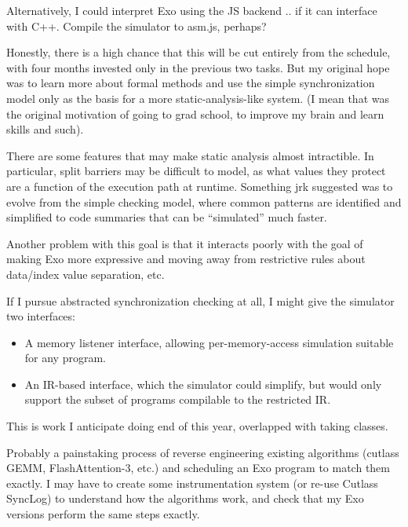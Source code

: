 \filbreak
Alternatively, I could interpret Exo using the JS backend .. if it can interface with C++.
Compile the simulator to asm.js, perhaps?

\filbreak
{}

Honestly, there is a high chance that this will be cut entirely from the schedule, with four months invested only in the previous two tasks.
But my original hope was to learn more about formal methods and use the simple synchronization model only as the basis for a more static-analysis-like system.
(I mean that was the original motivation of going to grad school, to improve my brain and learn skills and such).

\filbreak
There are some features that may make static analysis almost intractible.
In particular, split barriers may be difficult to model, as what values they protect are a function of the execution path at runtime.
Something jrk suggested was to evolve from the simple checking model, where common patterns are identified and simplified to code summaries that can be ``simulated'' much faster.

\filbreak
Another problem with this goal is that it interacts poorly with the goal of making Exo more expressive and moving away from restrictive rules about data/index value separation, etc.

\filbreak
If I pursue abstracted synchronization checking at all, I might give the simulator two interfaces:
\begin{itemize}
  \item A memory listener interface, allowing per-memory-access simulation suitable for any program.
  \item An IR-based interface, which the simulator could simplify, but would only support the subset of programs compilable to the restricted IR.
\end{itemize}

\filbreak
{}

This is work I anticipate doing end of this year, overlapped with taking classes.

\filbreak
{} Probably a painstaking process of reverse engineering existing algorithms (cutlass GEMM, FlashAttention-3, etc.) and scheduling an Exo program to match them exactly.
I may have to create some instrumentation system (or re-use Cutlass SyncLog) to understand how the algorithms work, and check that my Exo versions perform the same steps exactly.

